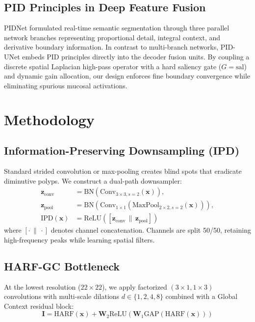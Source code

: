 \documentclass[conference]{IEEEtran}
\begin{document}
\subsection{PID Principles in Deep Feature Fusion}
PIDNet \cite{xu2023pidnet} formulated real-time semantic segmentation through three parallel network branches representing proportional detail, integral context, and derivative boundary information. In contrast to multi-branch networks, PID-UNet embeds PID principles directly into the decoder fusion units. By coupling a discrete spatial Laplacian high-pass operator with a hard saliency gate ($G = \text{sal}$) and dynamic gain allocation, our design enforces fine boundary convergence while eliminating spurious mucosal activations.

\section{Methodology}

\subsection{Information-Preserving Downsampling (IPD)}
Standard strided convolution or max-pooling creates blind spots that eradicate diminutive polyps. We construct a dual-path downsampler:
\begin{align}
\mathbf{z}_{\text{conv}} &= \text{BN}(\text{Conv}_{3\times3, s=2}(\mathbf{x})), \\
\mathbf{z}_{\text{pool}} &= \text{BN}(\text{Conv}_{1\times1}(\text{MaxPool}_{2\times2, s=2}(\mathbf{x}))), \\
\text{IPD}(\mathbf{x}) &= \text{ReLU}\left( \left[ \mathbf{z}_{\text{conv}} \,\|\, \mathbf{z}_{\text{pool}} \right] \right)
\end{align}
where $[\cdot \,\|\, \cdot]$ denotes channel concatenation. Channels are split 50/50, retaining high-frequency peaks while learning spatial filters.

\subsection{HARF-GC Bottleneck}
At the lowest resolution ($22\times22$), we apply factorized $(3\times1, 1\times3)$ convolutions with multi-scale dilations $d \in \{1, 2, 4, 8\}$ combined with a Global Context residual block:
\begin{equation}
\mathbf{I} = \text{HARF}(\mathbf{x}) + \mathbf{W}_2 \text{ReLU}\left(\mathbf{W}_1 \text{GAP}(\text{HARF}(\mathbf{x}))\right)
\end{equation}
\end{document}
